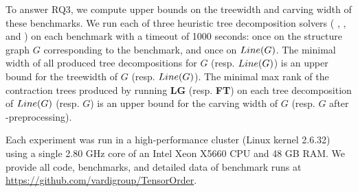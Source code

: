 

To answer RQ3, we compute upper bounds on the treewidth and carving width of these benchmarks. We run each of three heuristic tree decomposition solvers ( \cite{Tamaki17},  \cite{HS18}, and  \cite{AMW17}) on each benchmark with a timeout of 1000 seconds: once on the structure graph $G$ corresponding to the benchmark, and once on $Line(G)$. The minimal width of all produced tree decompositions for $G$ (resp. $Line(G)$) is an upper bound for the treewidth of $G$ (resp. $Line(G)$). The minimal max rank of the contraction trees produced by running \textbf{LG} (resp. \textbf{FT}) on each tree decomposition of $Line(G)$ (resp. $G$) is an upper bound for the carving width of $G$ (resp. $G$ after -preprocessing).

Each experiment was run in a high-performance cluster (Linux kernel 2.6.32) using a single 2.80 GHz core of an Intel Xeon X5660 CPU and 48 GB RAM. We provide all code, benchmarks, and detailed data of benchmark runs at \url{https://github.com/vardigroup/TensorOrder}.




